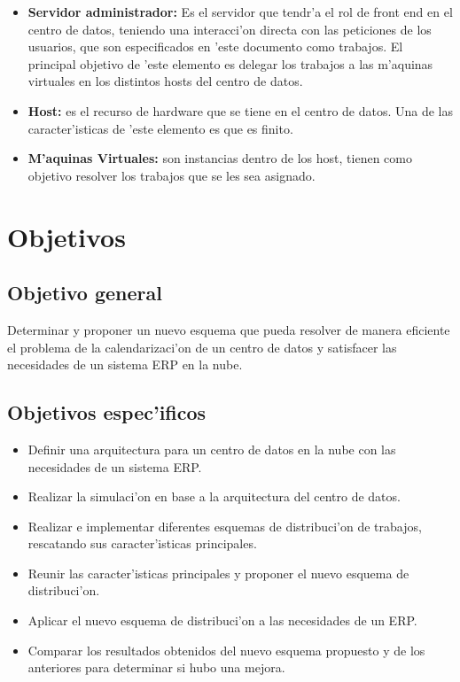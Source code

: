 \begin{itemize}
	\item \textbf{Servidor administrador:} Es el servidor que tendr'a el rol de front end en el centro de datos, teniendo una interacci'on directa con las peticiones de los usuarios, que son especificados en 'este documento como trabajos.
	El principal objetivo de 'este elemento es delegar los trabajos a las m'aquinas virtuales en los distintos hosts del centro de datos.
	\item \textbf{Host:} es el recurso de hardware que se tiene en el centro de datos. Una de las caracter'isticas de 'este elemento es que es finito.
	\item \textbf{M'aquinas Virtuales:} son instancias dentro de los host, tienen como objetivo resolver los trabajos que se les sea asignado.
	
	
\end{itemize}


\section*{Objetivos}


\subsection*{Objetivo general}


Determinar y proponer un nuevo esquema que pueda resolver de manera eficiente el problema de la calendarizaci'on de un centro de datos y satisfacer las necesidades de un sistema ERP en la nube.


\subsection*{Objetivos espec'ificos}


\begin{itemize}
	\item Definir una arquitectura para un centro de datos en la nube con las necesidades de un sistema ERP.
	\item Realizar la simulaci'on en base a la arquitectura del centro de datos.
	\item Realizar e implementar diferentes esquemas de distribuci'on de trabajos, rescatando sus caracter'isticas principales.
	\item Reunir las caracter'isticas principales y proponer el nuevo esquema de distribuci'on.
	\item Aplicar el nuevo esquema de distribuci'on a las necesidades de un ERP.
	\item Comparar los resultados obtenidos del nuevo esquema propuesto y de los anteriores para determinar si hubo una mejora.
\end{itemize}




